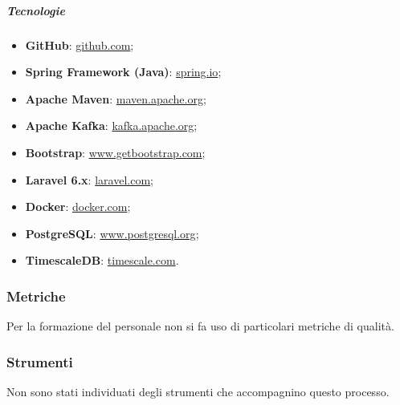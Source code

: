 		\subparagraph{Tecnologie}
		\begin{itemize}
			\item \textbf{GitHub}: \href{https://guides.github.com}{github.com};
			\item \textbf{Spring Framework (Java)}: \href{https://spring.io/guides/gs/rest-service}{spring.io};
			\item \textbf{Apache Maven}: \href{https://maven.apache.org/guides/getting-started}{maven.apache.org};
			\item \textbf{Apache Kafka}: \href{https://kafka.apache.org/}{kafka.apache.org};
			\item \textbf{Bootstrap}: \href{https://getbootstrap.com/}{www.getbootstrap.com};
			\item \textbf{Laravel 6.x}: \href{https://laravel.com/docs/6.x}{laravel.com};
			\item \textbf{Docker}: \href{https://docs.docker.com/get-started}{docker.com};
			\item \textbf{PostgreSQL}: \href{https://www.postgresql.org/docs/12}{www.postgresql.org}; 
			\item \textbf{TimescaleDB}: \href{https://docs.timescale.com/latest/getting-started}{timescale.com}.
		\end{itemize}


	\subsubsection{Metriche}
		Per la formazione del personale non si fa uso di particolari metriche di qualità.

	\subsubsection{Strumenti}
		Non sono stati individuati degli strumenti che accompagnino questo processo.